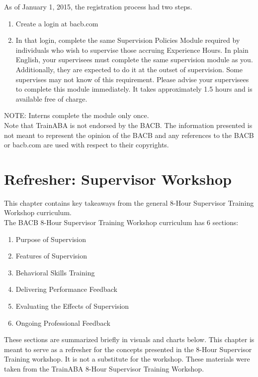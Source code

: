 As of January 1, 2015, the registration process had two steps.\\
\begin{enumerate}
\item Create a login at bacb.com\textregistered{}
\item In that login, complete the same Supervision Policies Module required by individuals who wish to supervise those accruing Experience Hours. In plain English, your supervisees must complete the same supervision module as you. Additionally, they are expected to do it at the outset of supervision. Some supervises may not know of this requirement. Please advise your supervisees to complete this module immediately. It takes approximately 1.5 hours and is available free of charge.
\end{enumerate}

NOTE: Interns complete the module only once.\\

Note that TrainABA is not endorsed by the BACB\textregistered{}. The information presented is not meant to represent the opinion of the BACB\textregistered{} and any references to the BACB\textregistered{} or bacb.com are used with respect to their copyrights.\\
%
%
%
%
%
%
%
%
%
%
%
%
%
%
%
%
%
%
%
%
%
%
\chapter{Refresher: Supervisor Workshop}

This chapter contains key takeaways from the general 8-Hour Supervisor Training Workshop curriculum.\\

The BACB\textregistered{} 8-Hour Supervisor Training Workshop curriculum has 6 sections:
\begin{enumerate}
\item Purpose of Supervision
\item  Features of Supervision
\item  Behavioral Skills Training
\item  Delivering Performance Feedback
\item  Evaluating the Effects of Supervision
\item  Ongoing Professional Feedback
\end{enumerate}

These sections are summarized briefly in visuals and charts below. This chapter is meant to serve as a refresher for the concepts presented in the 8-Hour Supervisor Training workshop. It is not a substitute for the workshop. These materials were taken from the TrainABA 8-Hour Supervisor Training Workshop. 


